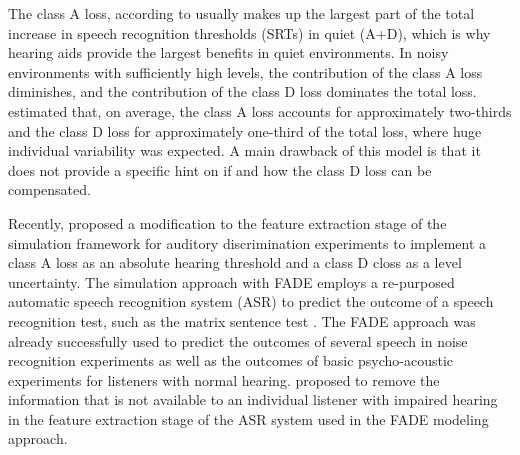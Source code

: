 \documentclass[10pt,a4paper,twocolumn]{article}
\begin{document}
The class A loss, according to \cite{plomp1978} usually makes up the largest part of the total increase in speech recognition thresholds (SRTs) in quiet (A+D), which is why hearing aids provide the largest benefits in quiet environments.
%
In noisy environments with sufficiently high levels, the contribution of the class A loss diminishes, and the contribution of the class D loss dominates the total loss.
%
\cite{plomp1978} estimated that, on average, the class A loss accounts for approximately two-thirds and the class D loss for approximately one-third of the total loss, where huge individual variability was expected.
%
A main drawback of this model is that it does not provide a specific hint on if and how the class D loss can be compensated.

Recently, \cite{kollmeier2016} proposed a modification to the feature extraction stage of the simulation framework for auditory discrimination experiments \citep[FADE,][]{schaedler2016a} to implement a class A loss as an absolute hearing threshold and a class D closs as a level uncertainty.
%
The simulation approach with FADE employs a re-purposed automatic speech recognition system (ASR) to predict the outcome of a speech recognition test, such as the matrix sentence test \citep{kollmeier2015}.
%
The FADE approach was already successfully used to predict the outcomes of several speech in noise recognition experiments \citep{schaedler2015,schaedler2016b} as well as the outcomes of basic psycho-acoustic experiments \citep{schaedler2016a} for listeners with normal hearing.
%
\cite{kollmeier2016} proposed to remove the information that is not available to an individual listener with impaired hearing in the feature extraction stage of the ASR system used in the FADE modeling approach.
\end{document}
